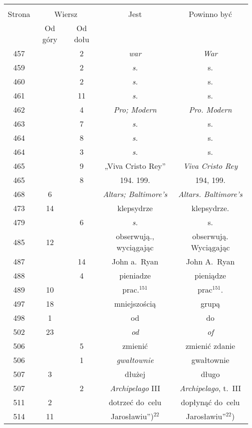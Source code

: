 \documentclass[a4paper,11pt]{article}
\begin{document}
\begin{center}
  \begin{tabular}{|c|c|c|c|c|}
    \hline
    & \multicolumn{2}{c|}{} & & \\
    Strona & \multicolumn{2}{c|}{Wiersz} & Jest
                              & Powinno być \\ \cline{2-3}
    & Od góry & Od dołu & & \\
    \hline
    457 & &  2 & \textit{war} & \textit{War} \\
    459 & &  2 & \textit{s.} & s. \\
    460 & &  2 & \textit{s.} & s. \\
    461 & & 11 & \textit{s.} & s. \\
    462 & &  4 & \textit{Pro; Modern} & \textit{Pro. Modern} \\
    463 & &  7 & \textit{s.} & s. \\
    464 & &  8 & \textit{s.} & s. \\
    464 & &  3 & \textit{s.} & s. \\
    465 & &  9 & „Viva Cristo Rey” & \textit{Viva Cristo Rey} \\
    465 & &  8 & 194. 199. & 194, 199. \\
    468 &  6 & & \textit{Altars; Baltimore's}
           & \textit{Altars. Baltimore's} \\
    473 & 14 & & klepsydrze & klepsydrze. \\
    479 & &  6 & \textit{s.} & s. \\
    485 & 12 & & obserwują., wyciągając & obserwują. Wyciągając \\
    487 & & 14 & John a.~Ryan & John A.~Ryan \\
    488 & &  4 & pieniadze & pieniądze \\
    489 & 10 & & prac.$^{151}$ & prac$^{151}$. \\
    497 & 18 & & mniejszością & grupą \\
    498 &  1 & & od & do \\
    502 & 23 & & \textit{od} & \textit{of} \\
    506 & &  5 & zmienić & zmienić zdanie \\
    506 & &  1 & \textit{gwałtownie} & gwałtownie \\
    507 &  3 & & dłużej & długo \\
    507 & &  2 & \textit{Archipelago} III & \textit{Archipelago}, t.~III \\
    511 &  2 & & dotrzeć do~celu & dopłynąć do~celu \\
    514 & 11 & & Jarosławiu”)$^{ 22 }$ & Jarosławiu”$^{ 22 }$) \\

\end{tabular}
\end{center}
\end{document}
